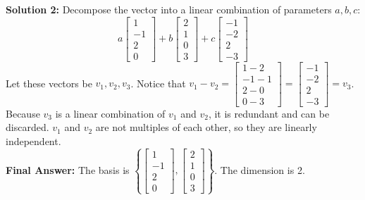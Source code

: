 \documentclass{article}
\begin{document}
\textbf{Solution 2:}
Decompose the vector into a linear combination of parameters $a, b, c$:
$$ a \begin{bmatrix} 1 \\ -1 \\ 2 \\ 0 \end{bmatrix} + b \begin{bmatrix} 2 \\ 1 \\ 0 \\ 3 \end{bmatrix} + c \begin{bmatrix} -1 \\ -2 \\ 2 \\ -3 \end{bmatrix} $$
Let these vectors be $v_1, v_2, v_3$. Notice that $v_1 - v_2 = \begin{bmatrix} 1-2 \\ -1-1 \\ 2-0 \\ 0-3 \end{bmatrix} = \begin{bmatrix} -1 \\ -2 \\ 2 \\ -3 \end{bmatrix} = v_3$. 
Because $v_3$ is a linear combination of $v_1$ and $v_2$, it is redundant and can be discarded. $v_1$ and $v_2$ are not multiples of each other, so they are linearly independent. \\
\textbf{Final Answer:} The basis is $\left\{ \begin{bmatrix} 1 \\ -1 \\ 2 \\ 0 \end{bmatrix}, \begin{bmatrix} 2 \\ 1 \\ 0 \\ 3 \end{bmatrix} \right\}$. The dimension is 2. \\
\end{document}
